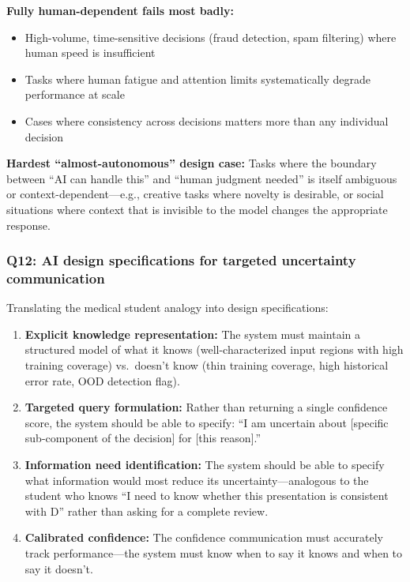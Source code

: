 \textbf{Fully human-dependent fails most badly:}
\begin{itemize}
    \item High-volume, time-sensitive decisions (fraud detection, spam filtering) where human speed is insufficient
    \item Tasks where human fatigue and attention limits systematically degrade performance at scale
    \item Cases where consistency across decisions matters more than any individual decision
\end{itemize}

\textbf{Hardest ``almost-autonomous'' design case:} Tasks where the boundary between ``AI can handle this'' and ``human judgment needed'' is itself ambiguous or context-dependent---e.g., creative tasks where novelty is desirable, or social situations where context that is invisible to the model changes the appropriate response.

\subsubsection*{Q12: AI design specifications for targeted uncertainty communication}

Translating the medical student analogy into design specifications:

\begin{enumerate}
    \item \textbf{Explicit knowledge representation:} The system must maintain a structured model of what it knows (well-characterized input regions with high training coverage) vs.\ doesn't know (thin training coverage, high historical error rate, OOD detection flag).
    \item \textbf{Targeted query formulation:} Rather than returning a single confidence score, the system should be able to specify: ``I am uncertain about [specific sub-component of the decision] for [this reason].''
    \item \textbf{Information need identification:} The system should be able to specify what information would most reduce its uncertainty---analogous to the student who knows ``I need to know whether this presentation is consistent with D'' rather than asking for a complete review.
    \item \textbf{Calibrated confidence:} The confidence communication must accurately track performance---the system must know when to say it knows and when to say it doesn't.
\end{enumerate}


